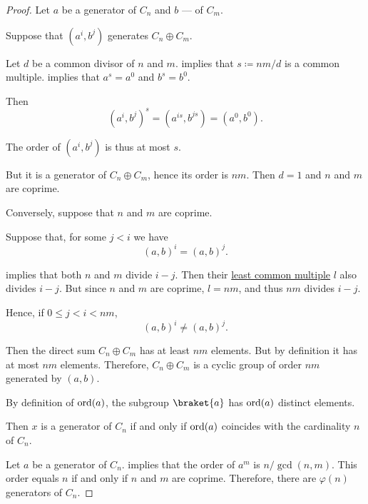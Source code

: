 \begin{proof}
   Let \( a \) be a generator of \( C_n \) and \( b \) --- of \( C_m \).

  \SufficiencySubProof* Suppose that \( (a^i, b^j) \) generates \( C_n \oplus C_m \).

  Let \( d \) be a common divisor of \( n \) and \( m \).  implies that \( s \coloneqq nm / d \) is a common multiple.  implies that \( a^s = a^0 \) and \( b^s = b^0 \).

  Then
  \begin{equation*}
    (a^i, b^j)^s = (a^{is}, b^{js}) = (a^0, b^0).
  \end{equation*}

  The order of \( (a^i, b^j) \) is thus at most \( s \).

  But it is a generator of \( C_n \oplus C_m \), hence its order is \( nm \). Then \( d = 1 \) and \( n \) and \( m \) are coprime.

  \NecessitySubProof* Conversely, suppose that \( n \) and \( m \) are coprime.

  Suppose that, for some \( j < i \) we have
  \begin{equation*}
    (a, b)^i = (a, b)^j.
  \end{equation*}

   implies that both \( n \) and \( m \) divide \( i - j \). Then their \hyperref[def:lcm]{least common multiple} \( l \) also divides \( i - j \). But since \( n \) and \( m \) are coprime, \( l = nm \), and thus \( nm \) divides \( i - j \).

  Hence, if \( 0 \leq j < i < nm \),
  \begin{equation*}
    (a, b)^i \neq (a, b)^j.
  \end{equation*}

  Then the direct sum \( C_n \oplus C_m \) has at least \( nm \) elements. But by definition it has at most \( nm \) elements. Therefore, \( C_n \oplus C_m \) is a cyclic group of order \( nm \) generated by \( (a, b) \).

   By definition of \( \operatorname{ord}(a) \), the subgroup \( \braket{ a } \) has \( \operatorname{ord}(a) \) distinct elements.

  Then \( x \) is a generator of \( C_n \) if and only if \( \operatorname{ord}(a) \) coincides with the cardinality \( n \) of \( C_n \).

   Let \( a \) be a generator of \( C_n \).  implies that the order of \( a^m \) is \( n / \gcd(n, m) \). This order equals \( n \) if and only if \( n \) and \( m \) are coprime. Therefore, there are \( \varphi(n) \) generators of \( C_n \).
\end{proof}
